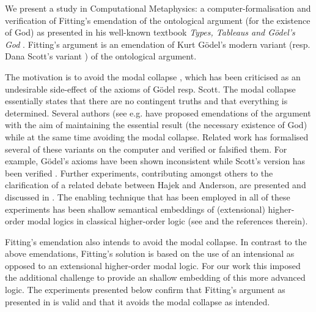 %
\begin{isabellebody}%
%
%
\isadelimtheory
%
\endisadelimtheory
%
\isatagtheory
%
\endisatagtheory
{\isafoldtheory}%
%
\isadelimtheory
%
\endisadelimtheory
%
\isamarkuptrue%
%
\begin{isamarkuptext}%
We present a study in Computational Metaphysics: a computer-formalisation and verification
of Fitting's emendation of the ontological argument (for the existence of God) as presented in
his well-known textbook \emph{Types, Tableaus and G\"odel's God} \cite{Fitting}. Fitting's argument 
is an emendation of Kurt G\"odel's modern variant \cite{GoedelNotes} (resp. Dana Scott's 
variant \cite{ScottNotes}) of the ontological argument.

The motivation is to avoid the modal collapse \cite{Sobel,sobel2004logic}, which has been criticised
as an undesirable side-effect of the axioms of G\"odel resp. Scott. The modal collapse essentially  
states that  there are no contingent truths and that everything is determined.
Several authors (see e.g. \cite{anderson90:_some_emend_of_goedel_ontol_proof,AndersonGettings,Hajek2002,bjordal99} 
have proposed emendations of the argument with the aim of maintaining the essential result 
(the necessary existence of God) while at the same time avoiding the modal collapse. 
Related work  has 
formalised several of these variants on the computer and verified or falsified them. For example,
G\"odel's axioms \cite{GoedelNotes} have been shown inconsistent \cite{IJCAI,C60}
while Scott's version has been verified \cite{ECAI}. Further experiments, contributing amongst others
to the clarification of a related debate between Hajek and Anderson, are presented and discussed in
\cite{J23}. The enabling technique that has been employed in all of these experiments has been
shallow semantical embeddings of (extensional) higher-order modal logics in classical higher-order
logic (see \cite{J23,R59} and the references therein).

Fitting's emendation also intends to avoid the modal collapse. In contrast to the above emendations, Fitting's
solution is based on the use of an  intensional as opposed to an extensional higher-order modal logic.
For our work this imposed the additional challenge to provide an shallow embedding of this more advanced
logic. The experiments presented below confirm that Fitting's argument as presented in \cite{Fitting}
is valid and that it avoids the modal collapse as intended.


\end{isamarkuptext}
\end{isabellebody}
